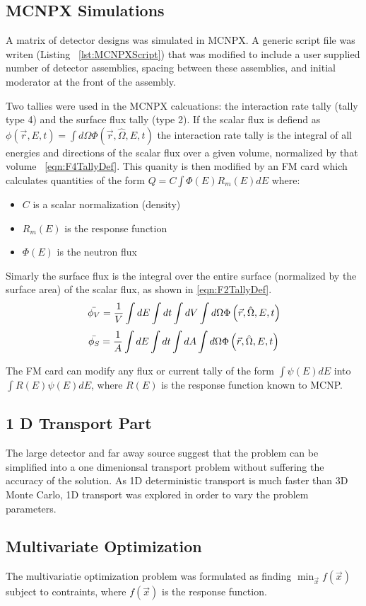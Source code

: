 \subsection{MCNPX Simulations}
\label{sec:MCNPXMethods}
A matrix of detector designs was simulated in MCNPX.
A generic script file was writen (Listing ~\ref{lst:MCNPXScript}) that was modified to include a user supplied number of detector assemblies, spacing between these assemblies, and initial moderator at the front of the assembly.


Two tallies were used in the MCNPX calcuations: the interaction rate tally (tally type 4) and the surface flux tally (type 2).
If the scalar flux is defiend as $\phi(\vec{r},E,t)=\int d\Omega \Phi(\vec{r},\hat{\Omega},E,t)$ the  interaction rate tally is the integral of all energies and directions of the scalar flux over a given volume, normalized by that volume ~\eqref{eqn:F4TallyDef}.
This quanity is then modified by an FM card which calculates quantities of the form $Q = C \int {\Phi(E) R_m(E) dE }$ where:
\begin{itemize}
    \item $C$ is a scalar normalization (density)
    \item $R_m(E)$ is the response function
    \item $\Phi(E)$ is the neutron flux
\end{itemize}
Simarly the surface flux is the integral over the entire surface (normalized by the surface area) of the scalar flux, as shown in \eqref{eqn:F2TallyDef}.
\begin{align}
    \label{eqn:F4TallyDef}
    \bar{\phi_V} = \frac{1}{V}\int dE \int dt \int dV \int d\Omega \Phi \left ( \vec{r},\hat{\Omega},E,t \right )
\end{align}
\begin{align}
    \label{eqn:F2TallyDef}
    \bar{\phi_S} = \frac{1}{A}\int dE \int dt \int dA \int d\Omega \Phi \left ( \vec{r},\hat{\Omega},E,t \right )
\end{align}

The FM card can modify any flux or current tally of the form $\int \psi (E) dE$ into $\int R(E)\psi(E) dE$, where $R(E)$ is the response function known to MCNP.
\subsection{1 D Transport Part}
The large detector and far away source suggest that the problem can be simplified into a one dimenionsal transport problem without suffering the accuracy of the solution.
As 1D deterministic transport is much faster than 3D Monte Carlo, 1D transport was explored in order to vary the problem parameters.

\subsection{Multivariate Optimization}
\label{sec:MVOptimization}

The multivariatie optimization problem was formulated as finding $\min_{\vec{x}} f (\vec{x})$ subject to contraints, where $f(\vec{x})$ is the response function.
